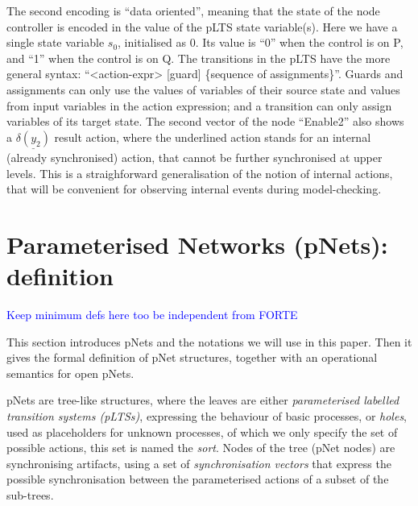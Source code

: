\documentclass{lncs/llncs}
\newcommand{\ERIC}[1]{\textcolor{blue}{#1}}
\begin{document}
The second encoding is ``data oriented'', meaning that the state of
the node controller is encoded in the value of the pLTS state
variable(s). Here we have a single state variable $s_0$, initialised
as $0$. Its value is ``0'' when the control is on P, and ``1'' when the
control is on Q. The transitions in the pLTS have the more general
syntax: ``<action-expr> [guard] \{sequence of assignments\}''. Guards
and assignments can only use the values of variables of their source
state and values from input variables in the action expression; and a
transition can only assign variables of its target state. 
The second vector of the node ``Enable2'' also shows a
$\underline{\delta(y_2)}$ result action, where the underlined action
stands for an internal (already synchronised) action, that cannot be
further synchronised at upper levels. This is a straighforward
generalisation of the notion of internal actions, that will be
convenient for observing internal events during model-checking. 



\section{Parameterised Networks (pNets): definition}
\label{section:pnets}

\ERIC{Keep minimum defs here too be independent from FORTE}

This section introduces pNets and the notations we will use in
this paper. Then it gives the formal definition of pNet structures,
together with an operational semantics for open pNets.

pNets are tree-like structures, where the leaves are either
\emph{parameterised labelled transition systems (pLTSs)}, expressing the
behaviour of basic processes, or \emph{holes}, used as placeholders
for unknown processes, of which we only specify the set of possible
actions, this set is named the \emph{sort}.
Nodes of the tree (pNet nodes) are synchronising artifacts, using a
set of \emph{synchronisation vectors} that express the possible
synchronisation between the parameterised actions of a subset of the
sub-trees.


\end{document}
